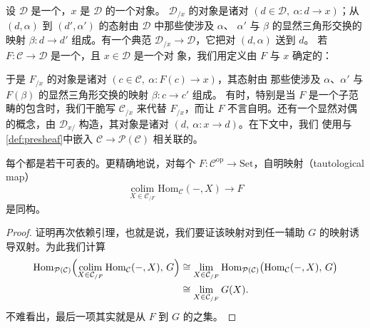 \begin{definition}\label{def:slice-category}
设 $\mathcal{D}$ 是一个\trCategory{}，$x$ 是 $\mathcal{D}$ 的一个对象。\trSliceCategory{}%
$\mathcal{D}_{/x}$ 的对象是诸对 $(d \in \mathcal{D},\ \alpha\colon d \to x)$；从
$(d,\alpha)$ 到 $(d',\alpha')$ 的态射由 $\mathcal{D}$ 中那些使涉及 $\alpha$、
$\alpha'$ 与 $\beta$ 的显然三角形交换的映射 $\beta\colon d \to d'$ 组成。有一个典范\trFunctor{}%
$\mathcal{D}_{/x} \to \mathcal{D}$，它把对 $(d,\alpha)$ 送到 $d$。
若 $F\colon \mathcal{C} \to \mathcal{D}$ 是一个\trFunctor{}，且 $x \in \mathcal{D}$ 是一个对
象，我们用\trPullback{}定义由 $F$ 与 $x$ 确定的\trSliceCategory{}：
\begin{center}
\end{center}
于是 $F_{/x}$ 的对象是诸对 $(c \in \mathcal{C},\ \alpha\colon F(c) \to x)$，其态射由
那些使涉及 $\alpha$、$\alpha'$ 与 $F(\beta)$ 的显然三角形交换的映射
$\beta\colon c \to c'$ 组成。
有时，特别是当 $F$ 是一个子范畴的包含\trFunctor{}时，我们干脆写 $\mathcal{C}_{/x}$ 来代替
$F_{/x}$，而让\trFunctor{} $F$ 不言自明。还有一个显然对偶的\trSliceCategory{}概念，由
$\mathcal{D}_{x/}$ 构造，其对象是诸对 $(d,\ \alpha\colon x \to d)$。在下文中，我们
使用与\cref{def:presheaf}中\trYoneda{}嵌入 $\mathcal{C} \to \mathcal{P}(\mathcal{C})$
相关联的\trSliceCategory{}。
\end{definition}

\begin{lemma}\label{lem:presheaf-colimit-representables}
{\sloppy{}
每个\trPresheaf{}都是若干可表\trObject{}的\trColimit{}。更精确地说，对每个%
\trPresheaf{}%
$F\colon \mathcal{C}^{\mathrm{op}} \to \mathrm{Set}$，自明映射（tautological map）
\[
\operatorname*{colim}_{X \in \mathcal{C}_{/F}}
\mathrm{Hom}_{\mathcal{C}}(-,X) \to F
\]
是同构。\par}
\end{lemma}

\begin{proof}
证明再次依赖\trYoneda{}引理，也就是说，我们要证该映射对到任一辅助\trPresheaf{} $G$ 的映射诱
导双射。为此我们计算
\begin{align*}
\mathrm{Hom}_{\mathcal{P}(\mathcal{C})}\Bigl(
\operatorname*{colim}_{X \in \mathcal{C}_{/F}}
\mathrm{Hom}_{\mathcal{C}}(-,X),\, G\Bigr)
&\cong \operatorname*{lim}_{X \in \mathcal{C}_{/F}}
\mathrm{Hom}_{\mathcal{P}(\mathcal{C})}\bigl(\mathrm{Hom}_{\mathcal{C}}(-,X),\,
G\bigr) \\
&\cong \operatorname*{lim}_{X \in \mathcal{C}_{/F}} G(X).
\end{align*}
不难看出，最后一项其实就是从 $F$ 到 $G$ 的\trNaturalTransformation{}之集。
\end{proof}

